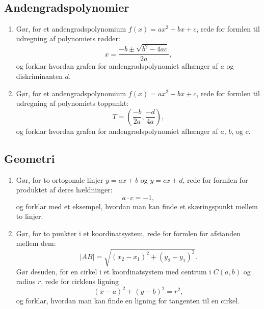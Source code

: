 \documentclass[10pt,a4paper]{article}
\begin{document}
\thispagestyle{plain}
\

\subsection*{Andengradspolynomier}
\noindent
\begin{enumerate}
  \item Gør, for et andengradspolynomium $f(x)=ax^2+bx+c$, rede for formlen til udregning af polynomiets rødder:
  $$x=\frac{-b\pm \sqrt{b^2-4ac}}{2a},$$
og forklar hvordan grafen for andengradspolynomiet afhænger af $a$ og diskriminanten $d$.
\item Gør, for et andengradspolynomium $f(x)=ax^2+bx+c$, rede for formlen til udregning af polynomiets toppunkt:
$$T=\left(\frac{-b}{2a},\frac{-d}{4a}\right),$$
og forklar hvordan grafen for andengradspolynomiet afhænger af $a$, $b$, og $c$.
\end{enumerate}

\subsection*{Geometri}
\begin{enumerate}[resume]
\item Gør, for to ortogonale linjer $y=ax+b$ og $y=cx+d$, rede for formlen for produktet af deres hældninger:
$$a\cdot c=-1,$$
og forklar med et eksempel, hvordan man kan finde et skæringspunkt mellem to linjer.
\item Gør, for to punkter i et koordinatsystem, rede for formlen for afstanden mellem dem:
$$|AB| = \sqrt{(x_2-x_1)^2+(y_2-y_1)^2}.$$
Gør desuden, for en cirkel i et koordinatsystem med centrum i $C(a,b)$ og radius $r$, rede for cirklens ligning
$$(x-a)^2+(y-b)^2=r^2,$$
og forklar, hvordan man kan finde en ligning for tangenten til en cirkel.
\end{enumerate}
\end{document}
